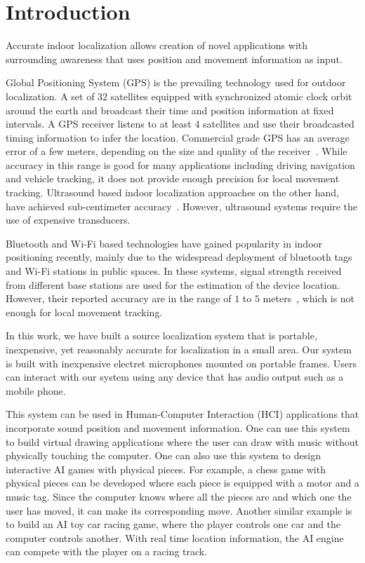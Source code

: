\chapter{Introduction}

Accurate indoor localization allows creation of novel applications with surrounding awareness that uses position and movement information as input. 

Global Positioning System (GPS) is the prevailing technology used for outdoor localization. A set of 32 satellites equipped with synchronized atomic clock orbit around the earth and broadcast their time and position information at fixed intervals. A GPS receiver listens to at least 4 satellites and use their broadcasted timing information to infer the location. Commercial grade GPS has an average error of a few meters, depending on the size and quality of the receiver~\cite{intro:gps}. While accuracy in this range is good for many applications including driving navigation and vehicle tracking, it does not provide enough precision for local movement tracking. Ultrasound based indoor localization approaches on the other hand, have achieved sub-centimeter accuracy~\cite{intro:ultra}. However, ultrasound systems require the use of expensive transducers.

Bluetooth and Wi-Fi based technologies have gained popularity in indoor positioning recently, mainly due to the widespread deployment of bluetooth tags and Wi-Fi stations in public spaces. In these systems, signal strength received from different base stations are used for the estimation of the device location. However, their reported accuracy are in the range of $1$ to $5$ meters~\cite{intro:blue, intro:loc}, which is not enough for local movement tracking.

In this work, we have built a source localization system that is portable, inexpensive, yet reasonably accurate for localization in a small area. Our system is built with inexpensive electret microphones mounted on portable frames. Users can interact with our system using any device that has audio output such as a mobile phone.

This system can be used in Human-Computer Interaction (HCI) applications that incorporate sound position and movement information. One can use this system to build virtual drawing applications where the user can draw with music without physically touching the computer. One can also use this system to design interactive AI games with physical pieces. For example, a chess game with physical pieces can be developed where each piece is equipped with a motor and a music tag. Since the computer knows where all the pieces are and which one the user has moved, it can make its corresponding move. Another similar example is to build an AI toy car racing game, where the player controls one car and the computer controls another. With real time location information, the AI engine can compete with the player on a racing track. 

